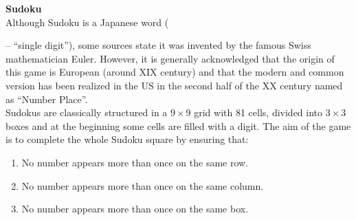 \documentclass[t,aspectratio=1610]{beamer}
\newcounter{row}
\newcounter{col}
\begin{document}
\begin{frame}
\textbf{Sudoku} \\

Although Sudoku is a Japanese word (\begin{uCJK}\end{uCJK} – ``single digit''),
some sources state it was invented by the famous Swiss mathematician Euler.
However, it is generally acknowledged that the origin of this game is European
(around XIX century) and that the modern and common version has been realized
in the US in the second half of the XX century named as ``Number Place''.\\ 
\pause
\vspace{1em}
Sudokus are classically structured in a $9\times 9$ grid with 81 cells, divided into $3\times 3$ boxes and at the beginning some cells are filled with a digit. The aim of the game is to complete the whole Sudoku square by ensuring that:
\begin{enumerate}
\item No number appears more than once on the same row.
\item No number appears more than once on the same column.
\item No number appears more than once on the same box.
\end{enumerate}
\end{frame}
\end{document}
